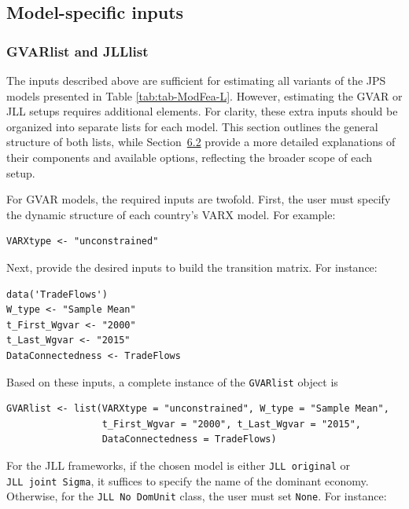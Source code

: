\subsection{Model-specific inputs}\label{model-specific-inputs}

\subsubsection{GVARlist and JLLlist}\label{S:SectionGVARJLLinputs}

The inputs described above are sufficient for estimating all variants of the JPS models presented in Table \ref{tab:tab-ModFea-L}. However, estimating the GVAR or JLL setups requires additional elements. For clarity, these extra inputs should be organized into separate lists for each model. This section outlines the general structure of both lists, while Section~\hyperref[S:PdynEst]{6.2} provide a more detailed explanations of their components and available options, reflecting the broader scope of each setup.

For GVAR models, the required inputs are twofold. First, the user must specify the dynamic structure of each country's VARX model. For example:

\begin{verbatim}
VARXtype <- "unconstrained"
\end{verbatim}

Next, provide the desired inputs to build the transition matrix. For instance:

\begin{verbatim}
data('TradeFlows')
W_type <- "Sample Mean"
t_First_Wgvar <- "2000"
t_Last_Wgvar <- "2015"
DataConnectedness <- TradeFlows
\end{verbatim}

Based on these inputs, a complete instance of the \texttt{GVARlist} object is

\begin{verbatim}
GVARlist <- list(VARXtype = "unconstrained", W_type = "Sample Mean",
                 t_First_Wgvar = "2000", t_Last_Wgvar = "2015",
                 DataConnectedness = TradeFlows)
\end{verbatim}

For the JLL frameworks, if the chosen model is either \texttt{JLL\ original} or \texttt{JLL\ joint\ Sigma}, it suffices to specify the name of the dominant economy. Otherwise, for the \texttt{JLL\ No\ DomUnit} class, the user must set \texttt{None}. For instance:

